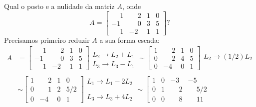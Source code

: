 \begin{exemplo}
	Qual o posto e a nulidade da matriz $A$, onde
	\[
		A =
		\begin{bmatrix}
			\phantom{-}1 & \phantom{-}2 & 1 & 0\\
			-1 & \phantom{-}0 & 3 & 5\\
			\phantom{-}1 & -2 & 1 & 1
		\end{bmatrix}?
	\]
	Precisamos primeiro reduzir $A$ a sua forma escada:
	\begin{align*}
		A &=
			\left[
			\begin{array}{cccc}
				\phantom{-}1 & \phantom{-}2 & 1 & 0\\
				-1 & \phantom{-}0 & 3 & 5\\
				\phantom{-}1 & -2 & 1 & 1
			\end{array}
			\right]
			\begin{array}{l}
				\\
				L_2 \to L_2 + L_1\\
				L_3 \to L_3 - L_1
			\end{array} \sim
			\left[
				\begin{array}{cccc}
					1 & \phantom{-}2 & 1 & 0\\
					0 & \phantom{-}2 & 4 & 5\\
					0 & -4 & 0 & 1
				\end{array}
			\right]
			\begin{array}{l}
				\\
				L_2 \to (1/2)L_2\\
				\phantom{x}
			\end{array}\\ \\ &\sim
			\left[
				\begin{array}{cccc}
					1 & \phantom{-}2 & 1 & 0\\
					0 & \phantom{-}1 & 2 & 5/2\\
					0 & -4 & 0 & 1
				\end{array}
			\right]
			\begin{array}{l}
				L_1 \to L_1 - 2L_2\\
				\phantom{x}\\
				L_3 \to L_3 + 4L_2
			\end{array} \sim
			\left[
				\begin{array}{cccc}
					1 & 0 & -3 & -5\\
					0 & 1 & \phantom{-}2 & \phantom{-}5/2\\
					0 & 0 & \phantom{-}8 & \phantom{-}11
				\end{array}

\end{align*}
\end{exemplo}
